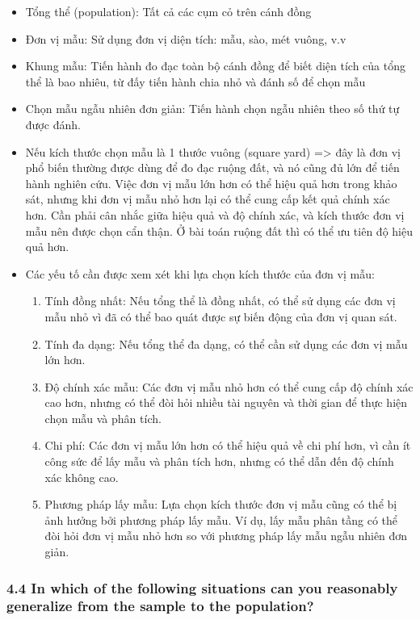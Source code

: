 \documentclass[
]{article}
\providecommand{\tightlist}{%
  \setlength{\itemsep}{0pt}\setlength{\parskip}{0pt}}
\begin{document}
\begin{itemize}
\tightlist
\item
  Tổng thể (population): Tất cả các cụm cỏ trên cánh đồng
\item
  Đơn vị mẫu: Sử dụng đơn vị diện tích: mẫu, sào, mét vuông, v.v
\item
  Khung mẫu: Tiến hành đo đạc toàn bộ cánh đồng để biết diện tích của
  tổng thể là bao nhiêu, từ đấy tiến hành chia nhỏ và đánh số để chọn
  mẫu
\item
  Chọn mẫu ngẫu nhiên đơn giản: Tiến hành chọn ngẫu nhiên theo số thứ tự
  được đánh.
\item
  Nếu kích thước chọn mẫu là 1 thước vuông (square yard) =\textgreater{}
  đây là đơn vị phổ biến thường được dùng để đo đạc ruộng đất, và nó
  cũng đủ lớn để tiến hành nghiên cứu. Việc đơn vị mẫu lớn hơn có thể
  hiệu quả hơn trong khảo sát, nhưng khi đơn vị mẫu nhỏ hơn lại có thể
  cung cấp kết quả chính xác hơn. Cần phải cân nhắc giữa hiệu quả và độ
  chính xác, và kích thước đơn vị mẫu nên được chọn cẩn thận. Ở bài toán
  ruộng đất thì có thể ưu tiên độ hiệu quả hơn.
\item
  Các yếu tố cần được xem xét khi lựa chọn kích thước của đơn vị mẫu:

  \begin{enumerate}
  \def\labelenumi{\arabic{enumi}.}
  \tightlist
  \item
    Tính đồng nhất: Nếu tổng thể là đồng nhất, có thể sử dụng các đơn vị
    mẫu nhỏ vì đã có thể bao quát được sự biến động của đơn vị quan sát.
  \item
    Tính đa dạng: Nếu tổng thể đa dạng, có thể cần sử dụng các đơn vị
    mẫu lớn hơn.
  \item
    Độ chính xác mẫu: Các đơn vị mẫu nhỏ hơn có thể cung cấp độ chính
    xác cao hơn, nhưng có thể đòi hỏi nhiều tài nguyên và thời gian để
    thực hiện chọn mẫu và phân tích.
  \item
    Chi phí: Các đơn vị mẫu lớn hơn có thể hiệu quả về chi phí hơn, vì
    cần ít công sức để lấy mẫu và phân tích hơn, nhưng có thể dẫn đến độ
    chính xác không cao.
  \item
    Phương pháp lấy mẫu: Lựa chọn kích thước đơn vị mẫu cũng có thể bị
    ảnh hưởng bởi phương pháp lấy mẫu. Ví dụ, lấy mẫu phân tầng có thể
    đòi hỏi đơn vị mẫu nhỏ hơn so với phương pháp lấy mẫu ngẫu nhiên đơn
    giản.
  \end{enumerate}
\end{itemize}

\hypertarget{in-which-of-the-following-situations-can-you-reasonably-generalize-from-the-sample-to-the-population}{%
\subsubsection{4.4 In which of the following situations can you
reasonably generalize from the sample to the
population?}\label{in-which-of-the-following-situations-can-you-reasonably-generalize-from-the-sample-to-the-population}}
\end{document}
